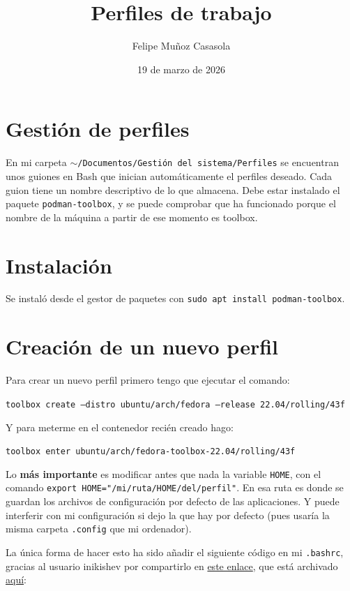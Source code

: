 \documentclass{article}
\title{Perfiles de trabajo}
\author{Felipe Muñoz Casasola}
\date{19 de marzo de 2026}
\begin{document}
    \maketitle
    \clearpage
    \tableofcontents
    \clearpage

    \section{Gestión de perfiles}
    En mi carpeta \texttt{$\sim$/Documentos/Gestión\ del\ sistema/Perfiles} se
    encuentran unos guiones en Bash que inician automáticamente el perfiles
    deseado. Cada guion tiene un nombre descriptivo de lo que almacena.
    Debe estar instalado el paquete \texttt{podman-toolbox}, y se puede
    comprobar que ha funcionado porque el nombre de la máquina a partir de
    ese momento es toolbox.

    \section{Instalación}
    Se instaló desde el gestor de paquetes con
    \texttt{sudo apt install podman-toolbox}.

    \section{Creación de un nuevo perfil}
    Para crear un nuevo perfil primero tengo que ejecutar el comando:

    \texttt{toolbox create --distro ubuntu/arch/fedora --release 22.04/rolling/43f}

    Y para meterme en el contenedor recién creado hago:

    \texttt{toolbox enter ubuntu/arch/fedora-toolbox-22.04/rolling/43f}

    Lo \textbf{más importante} es modificar antes que nada la variable \texttt{HOME},
    con el comando \texttt{export HOME="/mi/ruta/HOME/del/perfil"}. En esa ruta
    es donde se guardan los archivos de configuración por defecto de las aplicaciones.
    Y puede interferir con mi configuración si dejo la que hay por defecto (pues
    usaría la misma carpeta \texttt{.config} que mi ordenador).

    La única forma de hacer esto ha sido añadir el siguiente código en
    mi \texttt{.bashrc}, gracias al usuario inikishev por compartirlo en
    \href{https://github.com/containers/toolbox/issues/348}{este enlace},
    que está archivado \href{https://web.archive.org/web/20260317144147/https://github.com/containers/toolbox/issues/348}
    {aquí}:
\end{document}
